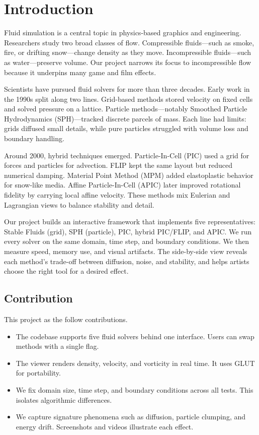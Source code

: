 \section{Introduction}

Fluid simulation is a central topic in physics-based graphics and engineering.
Researchers study two broad classes of flow.
Compressible fluids—such as smoke, fire, or drifting snow—change density as they move.
Incompressible fluids—such as water—preserve volume.
Our project narrows its focus to incompressible flow because it underpins many game and film effects.

Scientists have pursued fluid solvers for more than three decades.
Early work in the 1990s split along two lines. Grid-based methods stored velocity on fixed cells and solved pressure on a lattice.
Particle methods—notably Smoothed Particle Hydrodynamics (SPH)—tracked discrete parcels of mass.
Each line had limits: grids diffused small details, while pure particles struggled with volume loss and boundary handling.

Around 2000, hybrid techniques emerged.
Particle-In-Cell (PIC) used a grid for forces and particles for advection.
FLIP kept the same layout but reduced numerical damping.
Material Point Method (MPM) added elastoplastic behavior for snow-like media.
Affine Particle-In-Cell (APIC) later improved rotational fidelity by carrying local affine velocity.
These methods mix Eulerian and Lagrangian views to balance stability and detail.

Our project builds an interactive framework that implements five representatives: Stable Fluids (grid), SPH (particle), PIC, hybrid PIC/FLIP, and APIC.
We run every solver on the same domain, time step, and boundary conditions. We then measure speed, memory use, and visual artifacts.
The side-by-side view reveals each method's trade-off between diffusion, noise, and stability, and helps artists choose the right tool for a desired effect.


\subsection{Contribution}
This project as the follow contributions.
\begin{itemize}
	\item The codebase supports five fluid solvers behind one interface. Users can swap methods with a single flag.
	\item The viewer renders density, velocity, and vorticity in real time. It uses GLUT for portability.
	\item We fix domain size, time step, and boundary conditions across all tests. This isolates algorithmic differences.
	\item We capture signature phenomena such as diffusion, particle clumping, and energy drift. Screenshots and videos illustrate each effect.
\end{itemize}
